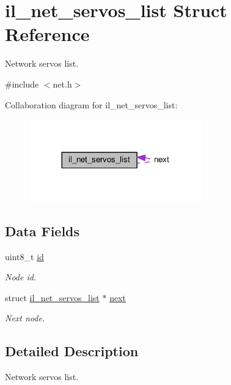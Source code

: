 \hypertarget{structil__net__servos__list}{}\section{il\+\_\+net\+\_\+servos\+\_\+list Struct Reference}
\label{structil__net__servos__list}


Network servos list.  




{\ttfamily \#include $<$net.\+h$>$}



Collaboration diagram for il\+\_\+net\+\_\+servos\+\_\+list\+:\nopagebreak
\begin{figure}[H]
\begin{center}
\leavevmode
\includegraphics[width=212pt]{structil__net__servos__list__coll__graph}
\end{center}
\end{figure}
\subsection*{Data Fields}
\begin{DoxyCompactItemize}
\item 
uint8\+\_\+t \hyperlink{structil__net__servos__list_a6c8494453cd1a81ddc9cf12d208dc95d}{id}
\begin{DoxyCompactList}\small\item\em Node id. \end{DoxyCompactList}\item 
struct \hyperlink{structil__net__servos__list}{il\+\_\+net\+\_\+servos\+\_\+list} $\ast$ \hyperlink{structil__net__servos__list_a04bbddceab98ab0f7e9cc50a9b46714e}{next}
\begin{DoxyCompactList}\small\item\em Next node. \end{DoxyCompactList}\end{DoxyCompactItemize}


\subsection{Detailed Description}
Network servos list. 

